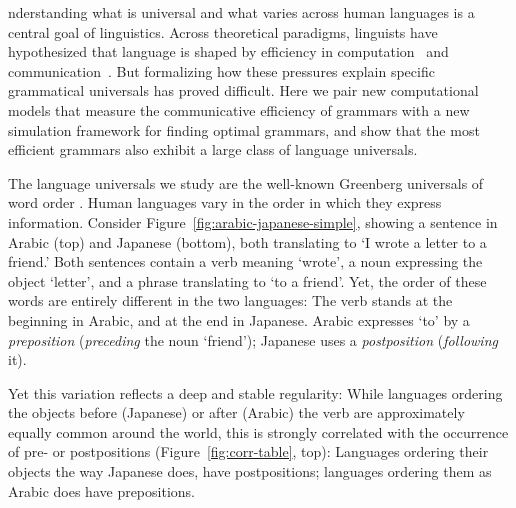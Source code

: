 \documentclass[9pt,twocolumn,twoside,lineno]{pnas-new}
\begin{document}



nderstanding what is universal and what varies across human languages is a central goal of linguistics.
Across theoretical paradigms, linguists have hypothesized that language is shaped by efficiency in computation~\cite{chomsky2005three,hauser2002faculty, berwick1984grammatical,hawkins1994performance} and communication~\cite{zipf1949human, Croft:Cruse:2004, Goldberg:2005, pinker1990natural, smith2013linguistic, nowak1999evolution, nowak2001towards, nowak2002computational}.
But formalizing  how these pressures explain specific grammatical universals has proved difficult.
Here we pair new computational models that measure the communicative efficiency of grammars with a new simulation framework for finding optimal grammars, and show that the most efficient grammars also exhibit a large class of language universals. %

The language universals we study are the well-known Greenberg universals of word order \cite{greenberg1963universals}. 
Human languages vary in the order in which they express information.
Consider Figure~\ref{fig:arabic-japanese-simple}, showing a sentence in Arabic (top) and Japanese (bottom), both translating to `I wrote a letter to a friend.'
Both sentences contain a verb meaning `wrote', a noun expressing  the object `letter', and a phrase translating to `to a friend'.
Yet, the order of these words are entirely different in the two languages:
The verb stands at the beginning in Arabic, and at the end in Japanese.
Arabic expresses `to' by a \emph{preposition} (\emph{preceding} the noun `friend'); Japanese uses a \emph{postposition} (\emph{following} it). 

Yet this variation reflects a deep and stable regularity:
While languages ordering the objects before (Japanese) or after (Arabic) the verb are approximately equally common around the world,
this is strongly correlated with the occurrence of pre- or postpositions (Figure~\ref{fig:corr-table}, top):
Languages ordering their objects the way Japanese does, have postpositions; languages ordering them as Arabic does have prepositions.
\end{document}
